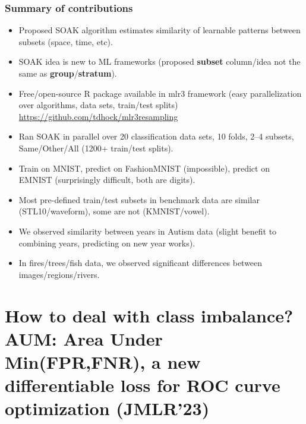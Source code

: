 \documentclass[t]{beamer}
\begin{document}
\begin{frame}
  \frametitle{Summary of contributions}
  \begin{itemize}
  \item Proposed SOAK algorithm estimates similarity of
    learnable patterns between 
    subsets (space, time, etc).
  \item SOAK idea is new to ML frameworks (proposed \textbf{subset} column/idea not the same as \textbf{group}/\textbf{stratum}).
  \item Free/open-source R package available in mlr3 framework (easy
    parallelization over algorithms, data sets, train/test splits)
    \url{https://github.com/tdhock/mlr3resampling}
  \item Ran SOAK in parallel over 20 classification data sets, 10
    folds, 2--4 subsets, Same/Other/All (1200+ train/test splits).
  \item Train on MNIST, predict on FashionMNIST (impossible), predict
    on EMNIST (surprisingly difficult, both are digits).
  \item Most pre-defined train/test subsets in benchmark data
    are similar (STL10/waveform), some are not (KMNIST/vowel).
  \item We observed similarity between years in Autism data (slight benefit to combining years, predicting on new year works).
  \item In fires/trees/fish data, we observed
    significant differences between images/regions/rivers.
  \end{itemize}
\end{frame}


\section{How to deal with class imbalance? \\ AUM: Area Under Min(FPR,FNR), a new differentiable loss for ROC curve optimization (JMLR'23)} 
\end{document}
